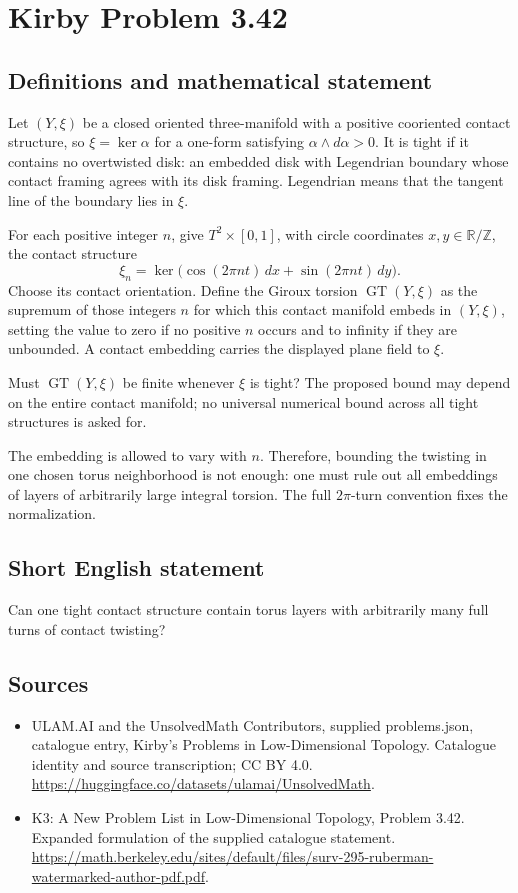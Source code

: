 \documentclass[11pt,a4paper]{article}
\begin{document}
\section*{Kirby Problem 3.42}\label{statement}

\subsection{Definitions and mathematical statement}
Let $(Y,\xi)$ be a closed oriented three-manifold with a positive cooriented contact structure, so $\xi=\ker\alpha$ for a one-form satisfying $\alpha\wedge d\alpha>0$. It is tight if it contains no overtwisted disk: an embedded disk with Legendrian boundary whose contact framing agrees with its disk framing. Legendrian means that the tangent line of the boundary lies in $\xi$.

For each positive integer $n$, give $T^2\times[0,1]$, with circle coordinates $x,y\in\mathbb R/\mathbb Z$, the contact structure
\[
\xi_n=\ker\bigl(\cos(2\pi nt)\,dx+\sin(2\pi nt)\,dy\bigr).
\]
Choose its contact orientation. Define the Giroux torsion $\operatorname{GT}(Y,\xi)$ as the supremum of those integers $n$ for which this contact manifold embeds in $(Y,\xi)$, setting the value to zero if no positive $n$ occurs and to infinity if they are unbounded. A contact embedding carries the displayed plane field to $\xi$.

Must $\operatorname{GT}(Y,\xi)$ be finite whenever $\xi$ is tight? The proposed bound may depend on the entire contact manifold; no universal numerical bound across all tight structures is asked for.

The embedding is allowed to vary with $n$. Therefore, bounding the twisting in one chosen torus neighborhood is not enough: one must rule out all embeddings of layers of arbitrarily large integral torsion. The full $2\pi$-turn convention fixes the normalization.
\subsection{Short English statement}
Can one tight contact structure contain torus layers with arbitrarily many full turns of contact twisting?
\subsection{Sources}
\begin{itemize}
\item[S1] ULAM.AI and the UnsolvedMath Contributors, supplied problems.json, catalogue entry, Kirby's Problems in Low-Dimensional Topology. Catalogue identity and source transcription; CC BY 4.0.
\url{https://huggingface.co/datasets/ulamai/UnsolvedMath}.
\item[S2] K3: A New Problem List in Low-Dimensional Topology, Problem 3.42. Expanded formulation of the supplied catalogue statement.
\url{https://math.berkeley.edu/sites/default/files/surv-295-ruberman-watermarked-author-pdf.pdf}.
\end{itemize}
\end{document}
